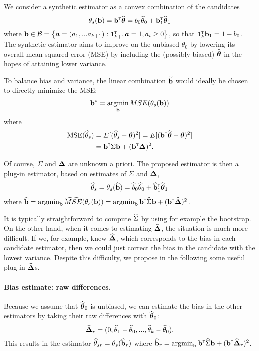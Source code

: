 \documentclass{article}
\begin{document}
We consider a synthetic estimator as a convex combination of the candidates \[
\theta_s({\bf b}) = {\bf b}^{{\sf \scriptscriptstyle{T}}}{\widehat{\boldsymbol{\theta}}} = b_0{\widehat\theta}_0 + {\bf b}_1^{{\sf \scriptscriptstyle{T}}}{\widehat{\boldsymbol{\theta}}}_1
\]
where ${\bf b} \in {\cal B} = \left\{{\mbox{\boldmath$a$}} = (a_1, ... a_{k+1}): {\bf 1}_{k+1}^{{\sf \scriptscriptstyle{T}}}{\mbox{\boldmath$a$}} = 1, a_i \geq 0\right\}$, so that ${\bf 1}_k^{{\sf \scriptscriptstyle{T}}}{\bf b}_1 = 1 - b_0$. The synthetic estimator aims to improve on the unbiased $\theta_0$ by lowering its overall mean squared error (MSE) by including the (possibly biased) ${\widehat{\boldsymbol{\theta}}}$ in the hopes of attaining lower variance.

To balance bias and variance, the linear combination ${\widetilde {{\bf b}}}$ would ideally be chosen to directly minimize the MSE:
\begin{align}
    {\bf b}^* = \mathop{\mbox{argmin}}_{{\bf b}}MSE(\theta_s({\bf b}))
\end{align}
where 
\begin{align*}
\text{MSE}({\widehat\theta}_s) &= E[({\widehat\theta}_s - \boldsymbol{\theta})^2] = E[({\bf b}^{{\sf \scriptscriptstyle{T}}}{\widehat{\boldsymbol{\theta}}} - \boldsymbol{\theta})^2]\\
&= {\bf b}^{{\sf \scriptscriptstyle{T}}}\Sigma{\bf b} + ({\bf b}^{{\sf \scriptscriptstyle{T}}} \boldsymbol{\Delta})^2.
\end{align*}

Of course, $\Sigma$ and $\boldsymbol{\Delta}$ are unknown a priori. The proposed estimator is then a plug-in estimator, based on estimates of $\Sigma$ and $\boldsymbol{\Delta}$,
\begin{align}
    {\widehat\theta}_s = \theta_s({\widehat {{\bf b}}}) = {\widehat b}_0{\widehat\theta}_0 + {\widehat {{\bf b}}}_1^{{\sf \scriptscriptstyle{T}}}{\widehat{\boldsymbol{\theta}}}_1
\end{align}
where $ {\widehat {{\bf b}}} = \mathop{\mbox{argmin}}_{{\bf b}}\widehat{MSE}(\theta_s({\bf b})) = \mathop{\mbox{argmin}}_{{\bf b}}{\bf b}^{{\sf \scriptscriptstyle{T}}}{\widehat\Sigma}{\bf b} + ({\bf b}^{{\sf \scriptscriptstyle{T}}} {\widehat{\boldsymbol{\Delta}}})^2$. 

It is typically straightforward to compute ${\widehat\Sigma}$ by using for example the bootstrap. On the other hand, when it comes to estimating ${\widehat{\boldsymbol{\Delta}}}$, the situation is much more difficult. If we, for example, knew ${\widehat{\boldsymbol{\Delta}}}$, which corresponds to the bias in each candidate estimator, then we could just correct the bias in the candidate with the lowest variance. Despite this difficulty, we propose in the following some useful plug-in ${\widehat{\boldsymbol{\Delta}}}$s.

\paragraph{Bias estimate: raw differences.}
Because we assume that ${\widehat{\boldsymbol{\theta}}}_0$ is unbiased, we can estimate the bias in the other estimators by taking their raw differences with ${\widehat{\boldsymbol{\theta}}}_0$:
\[
{\widehat{\boldsymbol{\Delta}}}_r = (0, {\widehat\theta}_1 - {\widehat\theta}_0, ..., {\widehat\theta}_k - {\widehat\theta}_0).
\]
This results in the estimator ${\widehat\theta}_{sr} = \theta_s({\widehat {{\bf b}}}_r)$ where ${\widehat {{\bf b}}}_r = \mathop{\mbox{argmin}}_{{\bf b}}{\bf b}^{{\sf \scriptscriptstyle{T}}}{\widehat\Sigma}{\bf b} + ({\bf b}^{{\sf \scriptscriptstyle{T}}} {\widehat{\boldsymbol{\Delta}}}_r)^2$.
\end{document}

